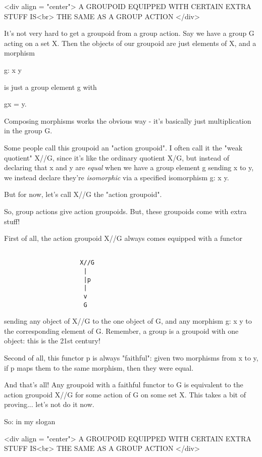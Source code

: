 <div align = "center">
             A GROUPOID EQUIPPED WITH CERTAIN EXTRA STUFF IS<br>
                     THE SAME AS A GROUP ACTION
</div>

It's not very hard to get a groupoid from a group action.  Say we have
a group G acting on a set X.   Then the objects of our groupoid are 
just elements of X, and a morphism

g: x \to  y

is just a group element g with 

gx = y.

Composing morphisms works the obvious way - it's basically just 
multiplication in the group G.

Some people call this groupoid an "action groupoid".  I often call 
it the "weak quotient" X//G, since it's like the ordinary quotient 
X/G, but instead of declaring that x and y are \emph{equal} when we have 
a group element g sending x to y, we instead declare they're 
\emph{isomorphic} via a specified isomorphism g: x \to  y.  

But for now, let's call X//G the "action groupoid".

So, group actions give action groupoids.  But, these groupoids come 
with extra stuff!

First of all, the action groupoid X//G always comes equipped with a
functor 


\begin{verbatim}

                     X//G 
                      |
                      |p
                      |
                      v
                      G
\end{verbatim}
    
sending any object of X//G to the one object of G, and any morphism 
g: x \to  y to the corresponding element of G.   Remember, a group is 
a groupoid with one object: this is the 21st century!  

Second of all, this functor p is always "faithful": given
two morphisms from x to y, if p maps them to the same morphism, then
they were equal.

And that's all!  Any groupoid with a faithful functor to G is
equivalent to the action groupoid X//G for some action of G on some 
set X.  This takes a bit of proving... let's not do it now.

So: in my slogan

<div align = "center">
             A GROUPOID EQUIPPED WITH CERTAIN EXTRA STUFF IS<br>
                     THE SAME AS A GROUP ACTION
</div>

